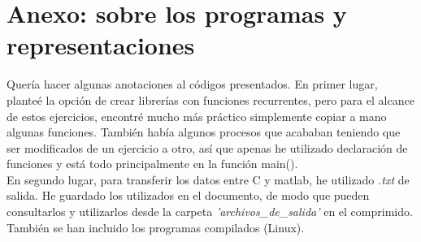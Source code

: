 \documentclass[a4paper,12pt,spanish]{article}
\begin{document}
	
	
	
	\section*{Anexo: sobre los programas y representaciones}
	
	Quería hacer algunas anotaciones al códigos presentados. En primer lugar, planteé la opción de crear librerías con funciones recurrentes, pero para el alcance de estos ejercicios, encontré mucho más práctico simplemente copiar a mano algunas funciones. También había algunos procesos que acababan teniendo que ser modificados de un ejercicio a otro, así que apenas he utilizado declaración de funciones y está todo principalmente en la función main().\\
	
	
	
	En segundo lugar, para transferir los datos entre C y matlab, he utilizado \textit{.txt} de salida. He guardado los utilizados en el documento, de modo que pueden consultarlos y utilizarlos desde la carpeta \textit{'archivos\_de\_salida'} en el comprimido. También se han incluido los programas compilados (Linux).
	
	
\end{document}
